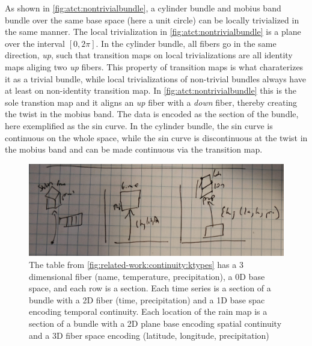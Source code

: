 \documentclass[10pt,journal,compsoc]{IEEEtran}
\theoremstyle{definition}
\theoremstyle{remark}
\begin{document}
As shown in \autoref{fig:atct:nontrivialbundle}, a cylinder bundle and mobius band bundle over the same base space (here a unit circle) can be locally trivialized in the same manner. The local trivialization in \autoref{fig:atct:nontrivialbundle} is a plane over the interval $\left[0,2\pi\right]$. In the cylinder bundle, all fibers go in the same direction, \textit{up}, such that transition maps on local trivializations are all identity maps aliging two \textit{up} fibers. This property of transition maps is what charaterizes it as a trivial bundle, while local trivializations of  non-trivial bundles always have at least on non-identity transition map. In \autoref{fig:atct:nontrivialbundle} this is the sole transtion map and it aligns an \textit{up} fiber with a \textit{down} fiber, thereby creating the twist in the mobius band. The data is encoded as the section of the bundle, here exemplified as the sin curve. In the cylinder bundle, the sin curve is continuous on the whole space, while the sin curve is discontinuous at the twist in the mobius band and can be made continuous via the transition map. 

\begin{figure}[h!]
  \includegraphics[width=\columnwidth]{dbundle.png}
  \caption{The table from \autoref{fig:related-work:continuity:ktypes} has a 3 dimensional fiber (name, temperature, precipitation), a 0D base space, and each row is a section. Each time series is a section of a bundle with a 2D fiber (time, precipitation) and a 1D base spac encoding temporal continuity. Each location of the rain map is a section of a bundle with a 2D plane base encoding spatial continuity and a 3D fiber space encoding (latitude, longitude, precipitation)
    \label{fig:atct:trivialbundle}}
\end{figure}
\end{document}
